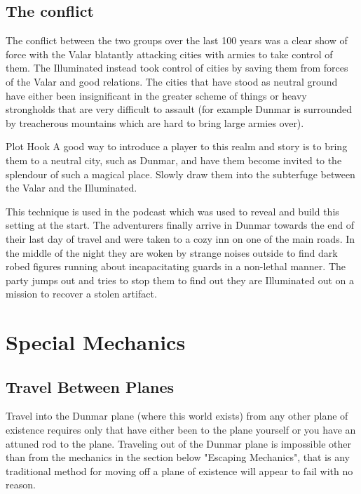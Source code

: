\documentclass[10pt,twoside,twocolumn]{article}
\begin{document}
\subsection{The conflict}
The conflict between the two groups over the last 100 years was a clear show of force with the Valar blatantly attacking cities with armies to take control of them. The Illuminated instead took control of cities by saving them from forces of the Valar and good relations. The cities that have stood as neutral ground have either been insignificant in the greater scheme of things or heavy strongholds that are very difficult to assault (for example Dunmar is surrounded by treacherous mountains which are hard to bring large armies over).

\begin{paperbox}{Plot Hook}
A good way to introduce a player to this realm and story is to bring them to a neutral city, such as Dunmar, and have them become invited to the splendour of such a magical place. Slowly draw them into the subterfuge between the Valar and the Illuminated.

This technique is used in the podcast which was used to reveal and build this setting at the start. The adventurers finally arrive in Dunmar towards the end of their last day of travel and were taken to a cozy inn on one of the main roads. In the middle of the night they are woken by strange noises outside to find dark robed figures running about incapacitating guards in a non-lethal manner. The party jumps out and tries to stop them to find out they are Illuminated out on a mission to recover a stolen artifact.
\end{paperbox}

\section{Special Mechanics}

\subsection{Travel Between Planes}
Travel into the Dunmar plane (where this world exists) from any other plane of existence requires only that have either been to the plane yourself or you have an attuned rod to the plane. Traveling out of the Dunmar plane is impossible other than from the mechanics in the section below "Escaping Mechanics", that is any traditional method for moving off a plane of existence will appear to fail with no reason.
\end{document}
